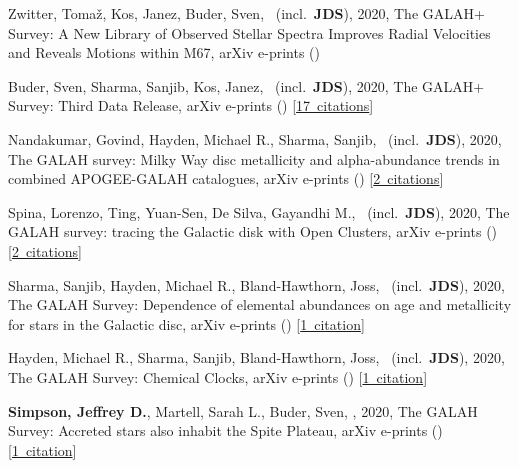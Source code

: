 \item[{\color{numcolor}\scriptsize13}] Zwitter, Toma{\v{z}}, Kos, Janez, Buder, Sven, \etal\ (incl.\ \textbf{JDS}), 2020, The GALAH+ Survey: A New Library of Observed Stellar Spectra Improves Radial Velocities and Reveals Motions within M67, arXiv e-prints ()

\item[{\color{numcolor}\scriptsize12}] Buder, Sven, Sharma, Sanjib, Kos, Janez, \etal\ (incl.\ \textbf{JDS}), 2020, The GALAH+ Survey: Third Data Release, arXiv e-prints () [\href{https://ui.adsabs.harvard.edu/#abs/2020arXiv201102505B}{17~citations}]

\item[{\color{numcolor}\scriptsize11}] Nandakumar, Govind, Hayden, Michael R., Sharma, Sanjib, \etal\ (incl.\ \textbf{JDS}), 2020, The GALAH survey: Milky Way disc metallicity and alpha-abundance trends in combined APOGEE-GALAH catalogues, arXiv e-prints () [\href{https://ui.adsabs.harvard.edu/#abs/2020arXiv201102783N}{2~citations}]

\item[{\color{numcolor}\scriptsize10}] Spina, Lorenzo, Ting, Yuan-Sen, De Silva, Gayandhi M., \etal\ (incl.\ \textbf{JDS}), 2020, The GALAH survey: tracing the Galactic disk with Open Clusters, arXiv e-prints () [\href{https://ui.adsabs.harvard.edu/#abs/2020arXiv201102533S}{2~citations}]

\item[{\color{numcolor}\scriptsize9}] Sharma, Sanjib, Hayden, Michael R., Bland-Hawthorn, Joss, \etal\ (incl.\ \textbf{JDS}), 2020, The GALAH Survey: Dependence of elemental abundances on age and metallicity for stars in the Galactic disc, arXiv e-prints () [\href{https://ui.adsabs.harvard.edu/#abs/2020arXiv201113818S}{1~citation}]

\item[{\color{numcolor}\scriptsize8}] Hayden, Michael R., Sharma, Sanjib, Bland-Hawthorn, Joss, \etal\ (incl.\ \textbf{JDS}), 2020, The GALAH Survey: Chemical Clocks, arXiv e-prints () [\href{https://ui.adsabs.harvard.edu/#abs/2020arXiv201113745H}{1~citation}]

\item[{\color{numcolor}\scriptsize7}] \textbf{Simpson, Jeffrey D.}, Martell, Sarah L., Buder, Sven, \etal, 2020, The GALAH Survey: Accreted stars also inhabit the Spite Plateau, arXiv e-prints () [\href{https://ui.adsabs.harvard.edu/#abs/2020arXiv201102659S}{1~citation}]

